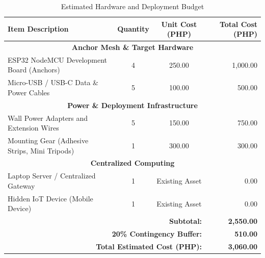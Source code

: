 \begin{table}[htbp]
\caption{Estimated Hardware and Deployment Budget}
\label{tab:budget}
\centering
\renewcommand{\arraystretch}{1.5}
\begin{tabular}{|p{}|c|c|r|}
\hline
\textbf{Item Description} & \textbf{Quantity} & \textbf{Unit Cost (PHP)} & \textbf{Total Cost (PHP)} \\
\hline
\multicolumn{4}{|c|}{\textbf{Anchor Mesh \& Target Hardware}} \\
\hline
ESP32 NodeMCU Development Board (Anchors) & 4 & 250.00 & 1,000.00 \\
\hline
Micro-USB / USB-C Data \& Power Cables & 5 & 100.00 & 500.00 \\
\hline
\multicolumn{4}{|c|}{\textbf{Power \& Deployment Infrastructure}} \\
\hline
Wall Power Adapters and Extension Wires & 5 & 150.00 & 750.00 \\
\hline
Mounting Gear (Adhesive Strips, Mini Tripods) & 1 & 300.00 & 300.00 \\
\hline
\multicolumn{4}{|c|}{\textbf{Centralized Computing}} \\
\hline
Laptop Server / Centralized Gateway & 1 & Existing Asset & 0.00 \\
\hline
Hidden IoT Device (Mobile Device) & 1 & Existing Asset & 0.00 \\
\hline
\hline
\multicolumn{3}{|r|}{\textbf{Subtotal:}} & \textbf{2,550.00} \\
\hline
\multicolumn{3}{|r|}{\textbf{20\% Contingency Buffer:}} & \textbf{510.00} \\
\hline
\hline
\multicolumn{3}{|r|}{\textbf{Total Estimated Cost (PHP):}} & \textbf{3,060.00} \\
\hline
\end{tabular}
\end{table}

\clearpage


\clearpage


